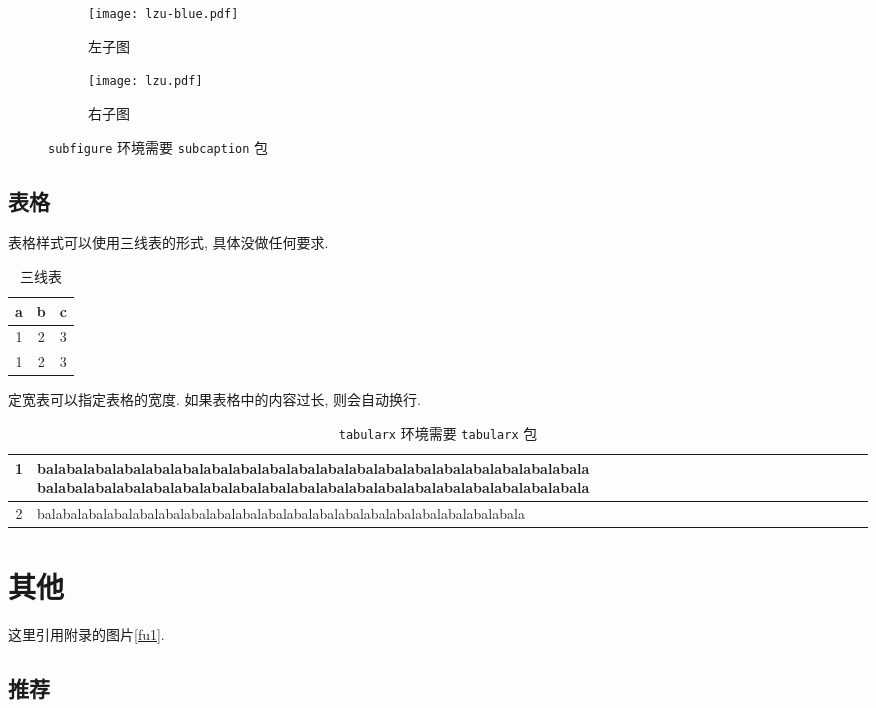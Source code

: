 \documentclass{lzuthesis}
\begin{document}
\begin{figure}[!h]
	\centering
	\begin{subfigure}[b]{0.25\linewidth}
		\texttt{[image: lzu-blue.pdf]}
		\caption{左子图}
	\end{subfigure}
	\quad
	\begin{subfigure}[b]{0.25\linewidth}
		\texttt{[image: lzu.pdf]}
		\caption{右子图}
	\end{subfigure}
	\caption{\texttt{subfigure} 环境需要 \texttt{subcaption} 包}
\end{figure}

\subsection{表格}

表格样式可以使用三线表的形式, 具体没做任何要求. 

\begin{table}[!h]
	\centering
	\begin{tabular}{ccc}
		\hline
		a &b &c \\
		\hline
		1 &2 &3 \\
		1 &2 &3 \\
		\hline
	\end{tabular}
	\caption{三线表}
\end{table}

定宽表可以指定表格的宽度. 如果表格中的内容过长, 则会自动换行. 

\begin{table}[!h]
	\centering
	\begin{tabularx}{\linewidth}{c|X}
		\hline
		1 &balabalabalabalabalabalabalabalabalabalabalabalabalabalabalabalabalabalabala
		balabalabalabalabalabalabalabalabalabalabalabalabalabalabalabalabalabalabala \\
		\hline
		2 &balabalabalabalabalabalabalabalabalabalabalabalabalabalabalabalabalabalabala \\
		\hline
	\end{tabularx}
	\caption{\texttt{tabularx} 环境需要 \texttt{tabularx} 包}
	\label{定宽表}
\end{table}

\section{其他}

这里引用附录的图片\ref{fu1}. 

\subsection{推荐}
\end{document}
